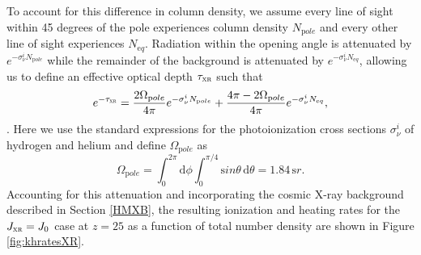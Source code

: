 \documentclass[../thesis.tex]{subfiles}
\begin{document}
To account for this difference in column density, we assume every line of sight within 45 degrees of the pole \citep{Hosokawaetal2011} experiences column density $N_{\mathrm pole}$ and every other line of sight experiences $N_{\mathrm eq}$. Radiation within the opening angle is attenuated by $e^{-\sigma_{\nu}^i N_{\mathrm pole}}$ while the remainder of the background is attenuated by $e^{-\sigma_{\nu}^i N_{\mathrm eq}}$, allowing us to define an effective optical depth $\tau_{\textsc{xr}}$ such that
\begin{equation}
e^{-\tau_{\textsc{xr}}} = \frac{2 \Omega_{\mathrm pole}}{4\pi} e^{-\sigma_{\nu}^i N_{\mathrm pole}} + \frac{4\pi - 2 \Omega_{\mathrm pole}}{4\pi} e^{-\sigma_{\nu}^i N_{\mathrm eq}},
\end{equation}
\citep[e.g.,][]{ClarkGlover2014}.
Here we use the standard expressions for the photoionization cross sections $\sigma^i_{\nu}$ of hydrogen and helium \citep[e.g.,][]{BarkanaLoeb2001, OsterbrockFerland2006} and define $\Omega_{\mathrm pole}$ as
\begin{equation}
\Omega_{\mathrm pole} = \int_0^{2\pi}{\mathrm d}\phi \int_0^{\pi/4}{\mathrm sin}\theta \,{\mathrm d}\theta
                         = 1.84\,{\mathrm sr}.
\end{equation}
Accounting for this attenuation and incorporating the cosmic X-ray background described in Section \ref{HMXB}, the resulting ionization and heating rates for the $J_{\textsc{xr}}=J_0$ case at $z=25$ as a function of total number density are shown in Figure \ref{fig:khratesXR}.
\end{document}
